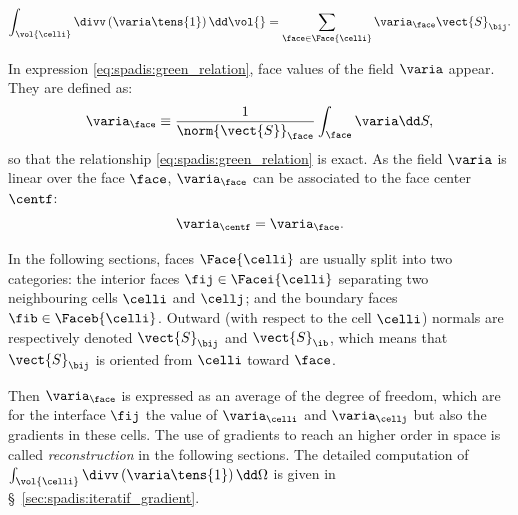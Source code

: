 \begin{equation}\label{eq:spadis:green_relation}
\int_{\vol{\celli}} \divv \left( \varia \tens{1}\right) \dd \vol{} =  \sum\limits_{\face \in \Face{\celli}} \varia_{\face}\vect{S}_{\bij}.
\end{equation}

In expression \eqref{eq:spadis:green_relation}, face values of the field $\varia$ appear. They are defined as:
\begin{equation}\label{eq:spadis:variaf_def}
\varia_\face \equiv \dfrac{1}{\norm{\vect{S}}_\face} \int_{\face} \varia \dd S,
\end{equation}
%
so that the relationship \eqref{eq:spadis:green_relation} is exact. As the field $\varia$ is linear over the face $\face$,
$\varia_\face$ can be associated to the face center $\centf$:
\begin{equation}\label{eq:spadis:variaf_id}
\varia_{\centf} = \varia_\face.
\end{equation}

In the following sections, faces $\Face{\celli}$ are usually split into two categories: the interior faces $\fij \in \Facei{\celli}$ separating
two neighbouring cells $\celli$ and $\cellj$; and the boundary faces $\fib \in \Faceb{\celli}$.
Outward (with respect to the cell $\celli$) normals are respectively denoted  $\vect{S}_{\bij}$ and $\vect{S}_\ib$,
which means that $\vect{S}_{\bij}$ is oriented from $\celli$ toward $\face$.

Then $\varia_{\face}$ is expressed as an average of the degree of freedom, which are for the interface $\fij$ the value of $\varia_{\celli}$
and $\varia_{\cellj}$ but also the gradients in these cells. The use of gradients to reach an higher order in space is called \emph{reconstruction}
in the following sections. The detailed computation of $\int_{\vol{\celli}} \divv \left( \varia \tens{1}\right) \dd \Omega $ is given in
 \S~\ref{sec:spadis:iteratif_gradient}.
%

